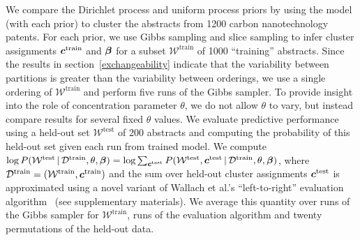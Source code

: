 \documentclass{article}
\begin{document}
We compare the Dirichlet process and uniform process priors by using
the model (with each prior) to cluster the abstracts from 1200 carbon
nanotechnology patents. For each prior, we use Gibbs sampling and
slice sampling to infer cluster assignments $\boldsymbol{c}^{\textrm{train}}$ and
$\boldsymbol{\beta}$ for a subset $\mathcal{W}^{\textrm{train}}$ of 1000
``training'' abstracts. Since the results in
section~\ref{exchangeability} indicate that the variability between
partitions is greater than the variability between orderings, we use a
single ordering of $\mathcal{W}^{\textrm{train}}$ and perform five
runs of the Gibbs sampler. To provide insight into the role of
concentration parameter $\theta$, we do not allow $\theta$ to vary,
but instead compare results for several fixed $\theta$ values. We
evaluate predictive performance using a held-out set
$\mathcal{W}^{\textrm{test}}$ of 200 abstracts and computing the
probability of this held-out set given each run from trained model.
We compute $\log{P(\mathcal{W}^{\textrm{test}} \,|\,\mathcal{D}^{\textrm{train}}, \theta, \boldsymbol{\beta})} =
\log{\sum_{\boldsymbol{c}^{\textrm{test}}} P(\mathcal{W}^{\textrm{test}},
  \boldsymbol{c}^{\textrm{test}} \,|\,\mathcal{D}^{\textrm{train}}, \theta,
  \boldsymbol{\beta})}$, where $\mathcal{D}^{\textrm{train}} =
(\mathcal{W}^{\textrm{train}}, \boldsymbol{c}^{\textrm{train}})$ and the sum over
held-out cluster assignments $\boldsymbol{c}^{\textrm{test}}$ is approximated
using a novel variant of Wallach et al.'s ``left-to-right'' evaluation
algorithm~\cite{wallach09evaluation} (see supplementary materials). We
average this quantity over runs of the Gibbs sampler for
$\mathcal{W}^{\textrm{train}}$, runs of the evaluation algorithm and
twenty permutations of the held-out data.
\end{document}
